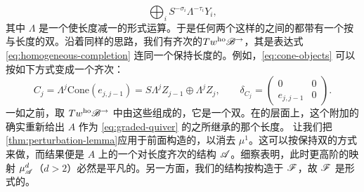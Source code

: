 \begin{equation}\label{eq:homogeneous-completion}
\bigoplus_i S^{-\sigma_i}\Lambda^{-\tau_i}Y_i,
\end{equation}
其中 $\Lambda$ 是一个使长度\trGrading{}减一的形式运算。于是任何两个这样的\trObject{}之间的\trMorphism{}都带有一个按\trDegree{}与长度的双\trGrading。沿着同样的思路，我们有齐次\trTwistedComplex{}的\trAinfty\trCategory{}$Tw^{\mathrm{ho}}\mathscr{B}^{\rightarrow}$，其\trObject{}是表达式 \eqref{eq:homogeneous-completion} 连同一个保持长度\trGrading{}的\trDifferential。例如，\eqref{eq:cone-objects} 可以按如下方式变成一个齐次\trTwistedComplex：
\begin{equation*}
C_j=\Lambda^j\mathrm{Cone}(e_{j,j-1})=S\Lambda^j Z_{j-1}\oplus\Lambda^j Z_j,
\qquad
\delta_{C_j}=\begin{pmatrix}0 & 0\\ e_{j,j-1} & 0\end{pmatrix}.
\end{equation*}
一如之前，取 $Tw^{\mathrm{ho}}\mathscr{B}^{\rightarrow}$ 中由这些\trObject{}组成的\trFullSubcategory，它是一个双\trGraded{}\trAinfty\trCategory。在\trCohomology{}的层面上，这个附加的\trGrading{}确实重新给出 $A$ 作为 \eqref{eq:graded-quiver} 的\trPathAlgebra{}之\trQuotient{}所继承的那个长度\trGrading。
让我们把\cref{thm:perturbation-lemma}应用于前面构造的\trFullSubcategory，以消去 $\mu^1$。这可以按保持双\trGrading{}的方式来做，而结果便是 $A$ 上的一个对长度\trGrading{}齐次的\trAinfty{}结构 $\mathscr{A}$。细察表明，此时更高阶的\trComposition{}映射 $\mu^d_{\mathscr{A}}$（$d>2$）必然是平凡的。另一方面，我们的\trAinfty{}结构按构造\trQuasiisomorphic{}于 $\mathscr{F}$，故 $\mathscr{F}$ 是形式的。

